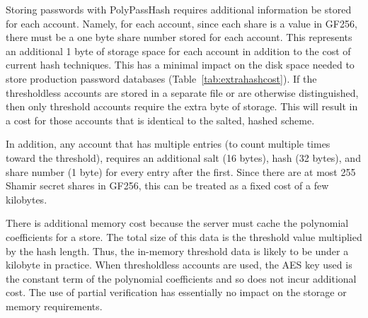 Storing passwords with PolyPassHash requires additional information be stored
for each account.   Namely, for each account, since each share is a value
in GF256, there must be a one byte share number stored for each account.   
This represents an additional 1 byte of storage space for each account in 
addition to the cost of current hash techniques.   This
has a minimal impact on the disk space needed to store production
password databases (Table~\ref{tab:extrahashcost}).   If the thresholdless 
accounts are stored in a separate file or are
otherwise distinguished, then only threshold accounts require the extra
byte of storage.   This will result in a cost for those accounts that is
identical to the salted, hashed scheme.

In addition, any account that has 
multiple entries (to count multiple times toward the threshold), requires an 
additional salt (16 bytes), hash (32 bytes), and share number (1 byte)
for every entry after the first.
Since there are at most 255 Shamir secret shares in GF256, this can be treated 
as a fixed cost of a few kilobytes.

There is additional memory cost because the server must cache
the polynomial coefficients for a store.   The total
size of this data is the threshold value multiplied by the hash length.
Thus, the in-memory threshold data is likely to be under a 
kilobyte in practice.%
When thresholdless accounts are used, the AES key used is the 
constant term 
of the polynomial coefficients and so does not incur additional cost.
The use of partial verification has essentially no impact on the storage or 
memory requirements.





